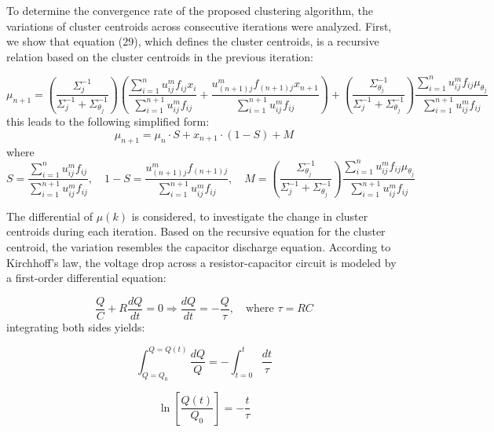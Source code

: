 \documentclass{article}
\begin{document}
To determine the convergence rate of the proposed clustering algorithm, the variations of cluster centroids across consecutive iterations were analyzed. First, we show that equation (29), which defines the cluster centroids, is a recursive relation based on the cluster centroids in the previous iteration:

\begin{equation}
\mu_{n+1} = \left( \frac{\Sigma_j^{-1}}{\Sigma_j^{-1} + \Sigma_{\theta_j}^{-1}} \right) \left( \frac{\sum_{i=1}^{n} u_{ij}^m f_{ij} x_i}{\sum_{i=1}^{n+1} u_{ij}^m f_{ij}} + \frac{u_{(n+1)j}^m f_{(n+1)j} x_{n+1}}{\sum_{i=1}^{n+1} u_{ij}^m f_{ij}} \right) + \left( \frac{\Sigma_{\theta_j}^{-1}}{\Sigma_j^{-1} + \Sigma_{\theta_j}^{-1}} \right) \frac{\sum_{i=1}^{n} u_{ij}^m f_{ij} \mu_{\theta_j}}{\sum_{i=1}^{n+1} u_{ij}^m f_{ij}}
\end{equation}
this leads to the following simplified form:
\begin{equation}
\mu_{n+1} = \mu_n \cdot S + x_{n+1} \cdot (1 - S) + M
\end{equation}
where
\begin{equation}
S = \frac{\sum_{i=1}^{n} u_{ij}^m f_{ij}}{\sum_{i=1}^{n+1} u_{ij}^m f_{ij}}, \quad 
1 - S = \frac{u_{(n+1)j}^m f_{(n+1)j}}{\sum_{i=1}^{n+1} u_{ij}^m f_{ij}}, \quad 
M = \left( \frac{\Sigma_{\theta_j}^{-1}}{\Sigma_j^{-1} + \Sigma_{\theta_j}^{-1}} \right) \frac{\sum_{i=1}^{n} u_{ij}^m f_{ij} \mu_{\theta_j}}{\sum_{i=1}^{n+1} u_{ij}^m f_{ij}}
\end{equation}

The differential of \( \mu(k) \) is considered, to investigate the change in cluster centroids during each iteration. Based on the recursive equation for the cluster centroid, the variation resembles the capacitor discharge equation. According to Kirchhoff's law, the voltage drop across a resistor-capacitor circuit is modeled by a first-order differential equation:

\begin{equation}
\frac{Q}{C} + R \frac{dQ}{dt} = 0 \Rightarrow \frac{dQ}{dt} = -\frac{Q}{\tau}, \quad \text{where } \tau = RC
\end{equation}
integrating both sides yields:

\begin{equation}
\int_{Q=Q_0}^{Q=Q(t)} \frac{dQ}{Q} = - \int_{t=0}^{t} \frac{dt}{\tau}
\end{equation}

\begin{equation}
\ln\left[\frac{Q(t)}{Q_0}\right] = -\frac{t}{\tau}
\end{equation}
\end{document}
